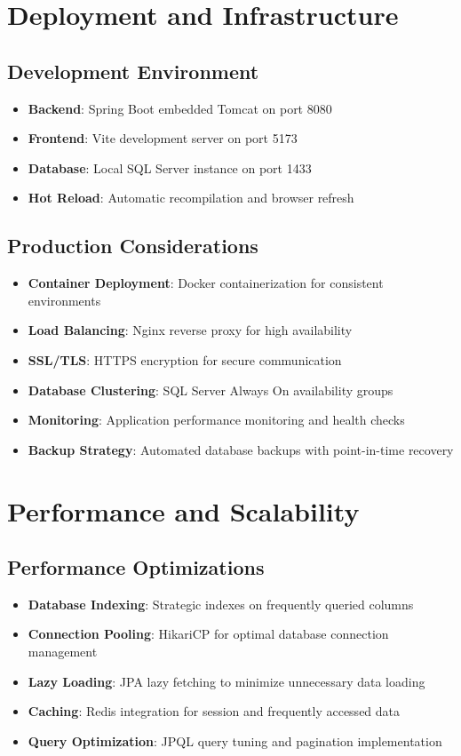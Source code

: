 \documentclass[12pt,a4paper]{article}
\begin{document}
\section{Deployment and Infrastructure}

\subsection{Development Environment}
\begin{itemize}
    \item \textbf{Backend}: Spring Boot embedded Tomcat on port 8080
    \item \textbf{Frontend}: Vite development server on port 5173
    \item \textbf{Database}: Local SQL Server instance on port 1433
    \item \textbf{Hot Reload}: Automatic recompilation and browser refresh
\end{itemize}

\subsection{Production Considerations}
\begin{itemize}
    \item \textbf{Container Deployment}: Docker containerization for consistent environments
    \item \textbf{Load Balancing}: Nginx reverse proxy for high availability
    \item \textbf{SSL/TLS}: HTTPS encryption for secure communication
    \item \textbf{Database Clustering}: SQL Server Always On availability groups
    \item \textbf{Monitoring}: Application performance monitoring and health checks
    \item \textbf{Backup Strategy}: Automated database backups with point-in-time recovery
\end{itemize}

\section{Performance and Scalability}

\subsection{Performance Optimizations}
\begin{itemize}
    \item \textbf{Database Indexing}: Strategic indexes on frequently queried columns
    \item \textbf{Connection Pooling}: HikariCP for optimal database connection management
    \item \textbf{Lazy Loading}: JPA lazy fetching to minimize unnecessary data loading
    \item \textbf{Caching}: Redis integration for session and frequently accessed data
    \item \textbf{Query Optimization}: JPQL query tuning and pagination implementation
\end{itemize}
\end{document}

